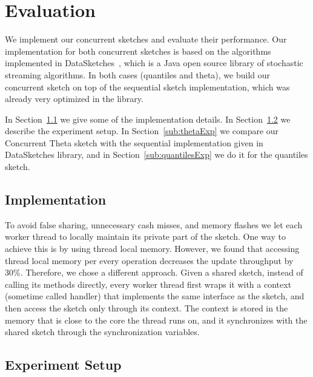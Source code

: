 \section{Evaluation}
\label{sec:evaluation}




We implement our concurrent sketches and evaluate their
performance.
Our implementation for both concurrent sketches is based on the
algorithms implemented in DataSketches~\cite{}, which is a Java
open source library of stochastic streaming algorithms.
In both cases (quantiles and theta), we build our concurrent
sketch on top of the sequential sketch implementation, which was
already very optimized in the library.

In Section~\ref{sub:imp} we give some of the implementation
details.
In Section~\ref{sub:setup} we describe the experiment setup.
In Section~\ref{sub:thetaExp} we compare our Concurrent Theta
sketch with the sequential implementation given in
DataSketches library, and in Section~\ref{sub:quantilesExp} we do
it for the quantiles sketch. 


\subsection{Implementation}
\label{sub:imp}

To avoid false sharing, unnecessary cash misses, and memory
flashes we let each worker thread to locally maintain its private
part of the sketch.
One way to achieve this is by using thread local memory.
However, we found that accessing thread local memory per
every operation decreases the update throughput by $30\%$.
Therefore, we chose a different approach.
Given a shared sketch, instead of calling its methods
directly, every worker thread first wraps it with a context
(sometime called handler) that implements the same interface as
the sketch, and then access the sketch only through its context.
The context is stored in the memory that is close to the core
the thread runs on, and it synchronizes with the shared sketch through the synchronization variables.

  

\subsection{Experiment Setup}
\label{sub:setup}

